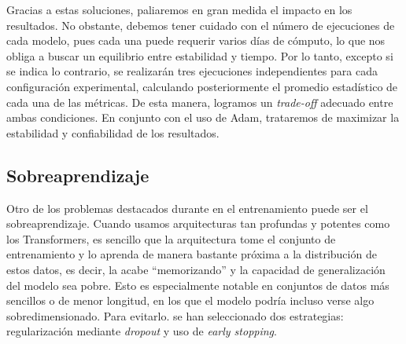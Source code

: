  
Gracias a estas soluciones, paliaremos en gran medida el impacto en los resultados. No obstante, debemos tener cuidado con el número de ejecuciones de cada modelo, pues cada una puede requerir varios días de cómputo, lo que nos obliga a buscar un equilibrio entre estabilidad y tiempo. Por lo tanto, excepto si se indica lo contrario, se realizarán tres ejecuciones independientes para cada configuración experimental, calculando posteriormente el promedio estadístico de cada una de las métricas. De esta manera, logramos un \textit{trade-off} adecuado entre ambas condiciones. En conjunto con el uso de Adam, trataremos de maximizar la estabilidad y confiabilidad de los resultados.
 
\subsection{Sobreaprendizaje}

Otro de los problemas destacados durante en el entrenamiento puede ser el sobreaprendizaje. Cuando usamos arquitecturas tan profundas y potentes como los Transformers, es sencillo que la arquitectura tome el conjunto de entrenamiento y lo aprenda de manera bastante próxima a la distribución de estos datos, es decir, la acabe ``memorizando'' y la capacidad de generalización del modelo sea pobre. Esto es especialmente notable en conjuntos de datos más sencillos o de menor longitud, en los que el modelo podría incluso verse algo sobredimensionado. Para evitarlo. se han seleccionado dos estrategias: regularización mediante \textit{dropout} y uso de \textit{early stopping}.

